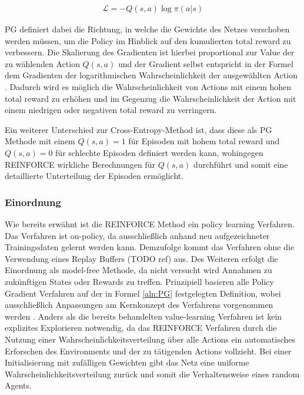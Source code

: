 \documentclass[11pt]{scrartcl}
\begin{document}
\begin{align}
\mathcal{L}=-Q(s,a)\log\pi(a|s)
\label{aln:PG}
\end{align}

PG definiert dabei die Richtung, in welche die Gewichte des Netzes verschoben werden müssen,
um die Policy im Hinblick auf den kumulierten total reward zu verbessern. Die Skalierung des
Gradienten ist hierbei proportional zur Value der zu wählenden Action $Q(s,a)$
und der Gradient selbst entspricht in der Formel dem Gradienten der logarithmischen
Wahrscheinlichkeit der ausgewählten Action \cite[~S.244]{L2018}. Dadurch wird es möglich
die Wahrscheinlichkeit von Actions mit einem hohen total reward zu erhöhen und im Gegenzug
die Wahrscheinlichkeit der Action mit einem niedrigen oder negativen total reward zu
verringern.

Ein weiterer Unterschied zur Cross-Entropy-Method ist, dass diese als PG Methode mit einem
$Q(s,a)=1$ für Episoden mit hohem total reward und $Q(s,a)=0$ für schlechte Episoden
definiert werden kann, wohingegen REINFORCE wirkliche Berechnungen für $Q(s,a)$ durchführt
und somit eine detaillierte Unterteilung der Episoden ermöglicht.

\subsubsection{Einordnung}
Wie bereits erwähnt ist die REINFORCE Method ein policy learning Verfahren. Das Verfahren ist
on-policy, da ausschließlich anhand neu aufgezeichneter Trainingsdaten gelernt werden kann.
Demzufolge kommt das Verfahren ohne die Verwendung eines Replay Buffers (TODO ref) %
aus. Des Weiteren erfolgt die Einordnung als model-free Methode, da nicht versucht wird
Annahmen zu zukünftigen States oder Rewards zu treffen. Prinzipiell basieren alle Policy
Gradient Verfahren auf der in Formel \ref{aln:PG} festgelegten Definition, wobei
ausschließlich Anpassungen am Kernkonzept des Verfahrens vorgenommen werden
\cite[~S.244 f.]{L2018}. Anders als die bereits behandelten value-learning Verfahren ist
kein explizites Explorieren notwendig, da das REINFORCE Verfahren durch die Nutzung einer
Wahrscheinlichkeitsverteilung über alle Actions ein automatisches \grqq Erforschen\grqq 
des Environments und der zu tätigenden Actions vollzieht. Bei einer Initialisierung mit
zufälligen Gewichten gibt das Netz eine uniforme Wahrscheinlichkeitsverteilung zurück und
somit die Verhaltensweise eines random Agents.
\end{document}
